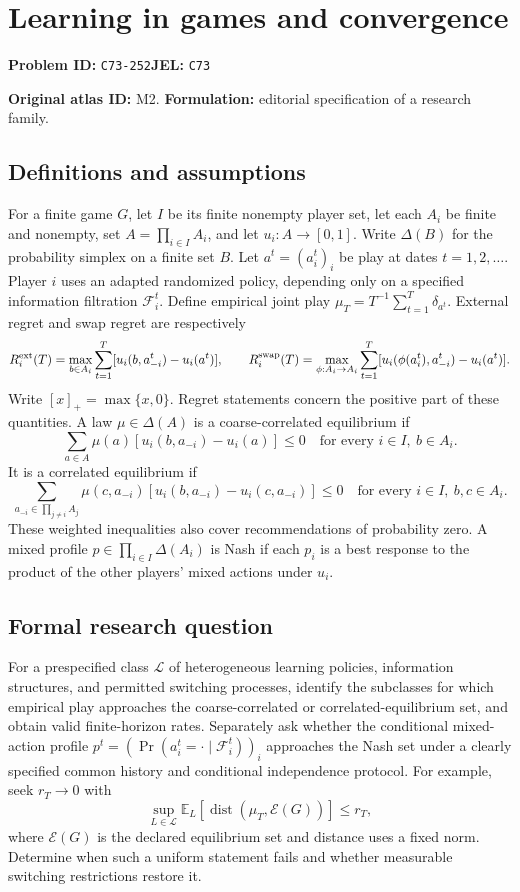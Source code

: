 \documentclass[11pt,a4paper]{article}
\begin{document}
\section*{Learning in games and convergence}
\textbf{Problem ID:} \texttt{C73-252}\quad \textbf{JEL:} \texttt{C73}\par
\label{problem:OP-0002}
\label{atlas:prob:M2}

\noindent\textbf{Original atlas ID:} M2. \textbf{Formulation:} editorial specification of a research family.

\subsection*{Definitions and assumptions}

For a finite game $G$, let $I$ be its finite nonempty player set, let each $A_i$ be finite and nonempty, set $A=\prod_{i\in I}A_i$, and let $u_i:A\to[0,1]$. Write $\Delta(B)$ for the probability simplex on a finite set $B$. Let $a^t=(a_i^t)_i$ be play at dates $t=1,2,\ldots$. Player $i$ uses an adapted randomized policy, depending only on a specified information filtration $\mathcal F_i^t$. Define empirical joint play $\mu_T=T^{-1}\sum_{t=1}^T\delta_{a^t}$. External regret and swap regret are respectively
\[
R_i^{\rm ext}(T)=\max_{b\in A_i}\sum_{t=1}^T[u_i(b,a_{-i}^t)-u_i(a^t)],\qquad
R_i^{\rm swap}(T)=\max_{\phi:A_i\to A_i}\sum_{t=1}^T[u_i(\phi(a_i^t),a_{-i}^t)-u_i(a^t)].
\]
Write $[x]_+=\max\{x,0\}$. Regret statements concern the positive part of these quantities. A law $\mu\in\Delta(A)$ is a coarse-correlated equilibrium if
\[
\sum_{a\in A}\mu(a)[u_i(b,a_{-i})-u_i(a)]\le0
\quad\text{for every }i\in I,\ b\in A_i.
\]
It is a correlated equilibrium if
\[
\sum_{a_{-i}\in\prod_{j\ne i}A_j}\mu(c,a_{-i})[u_i(b,a_{-i})-u_i(c,a_{-i})]\le0
\quad\text{for every }i\in I,\ b,c\in A_i.
\]
These weighted inequalities also cover recommendations of probability zero. A mixed profile $p\in\prod_{i\in I}\Delta(A_i)$ is Nash if each $p_i$ is a best response to the product of the other players' mixed actions under $u_i$.

\subsection*{Formal research question}

For a prespecified class $\mathcal L$ of heterogeneous learning policies, information structures, and permitted switching processes, identify the subclasses for which empirical play approaches the coarse-correlated or correlated-equilibrium set, and obtain valid finite-horizon rates. Separately ask whether the conditional mixed-action profile $p^t=(\Pr(a_i^t=\cdot\mid\mathcal F_i^t))_i$ approaches the Nash set under a clearly specified common history and conditional independence protocol. For example, seek $r_T\to0$ with
\[
\sup_{L\in\mathcal L}\mathbb E_L\!\left[\operatorname{dist}(\mu_T,\mathcal E(G))\right]\le r_T,
\]
where $\mathcal E(G)$ is the declared equilibrium set and distance uses a fixed norm. Determine when such a uniform statement fails and whether measurable switching restrictions restore it.
\end{document}

